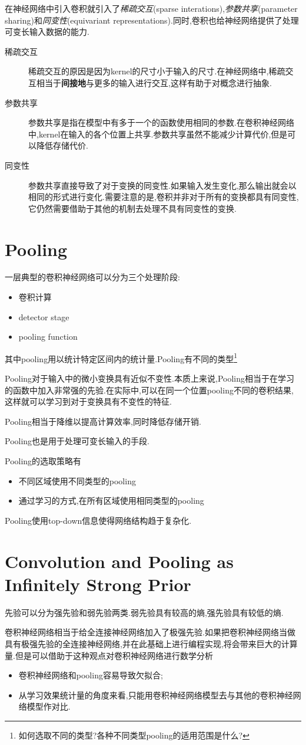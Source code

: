 在神经网络中引入卷积就引入了\textit{稀疏交互}(sparse interations),\textit{参数共享}(parameter sharing)和\textit{同变性}(equivariant representations).同时,卷积也给神经网络提供了处理可变长输入数据的能力.
\begin{description}
    \item [稀疏交互]
    稀疏交互的原因是因为kernel的尺寸小于输入的尺寸.在神经网络中,稀疏交互相当于\textbf{间接地}与更多的输入进行交互,这样有助于对概念进行抽象.
    \item [参数共享]
    参数共享是指在模型中有多于一个的函数使用相同的参数.在卷积神经网络中,kernel在输入的各个位置上共享.参数共享虽然不能减少计算代价,但是可以降低存储代价.
    \item [同变性]
    参数共享直接导致了对于变换的同变性.如果输入发生变化,那么输出就会以相同的形式进行变化.需要注意的是,卷积并非对于所有的变换都具有同变性,它仍然需要借助于其他的机制去处理不具有同变性的变换.
\end{description}

\section{Pooling}

一层典型的卷积神经网络可以分为三个处理阶段:
\begin{itemize}
    \item 卷积计算
    \item detector stage
    \item pooling function
\end{itemize}
其中pooling用以统计特定区间内的统计量.Pooling有不同的类型\footnote{如何选取不同的类型?各种不同类型pooling的适用范围是什么?}

Pooling对于输入中的微小变换具有近似不变性.本质上来说,Pooling相当于在学习的函数中加入非常强的先验.在实际中,可以在同一个位置pooling不同的卷积结果,这样就可以学习到对于变换具有不变性的特征.

Pooling相当于降维以提高计算效率,同时降低存储开销.

Pooling也是用于处理可变长输入的手段.

Pooling的选取策略有
\begin{itemize}
    \item 不同区域使用不同类型的pooling
    \item 通过学习的方式,在所有区域使用相同类型的pooling
\end{itemize}

Pooling使用top-down信息使得网络结构趋于复杂化.

\section{Convolution and Pooling as Infinitely Strong Prior}

先验可以分为强先验和弱先验两类.弱先验具有较高的熵,强先验具有较低的熵.

卷积神经网络相当于给全连接神经网络加入了极强先验.如果把卷积神经网络当做具有极强先验的全连接神经网络,并在此基础上进行编程实现,将会带来巨大的计算量.但是可以借助于这种观点对卷积神经网络进行数学分析
\begin{itemize}
    \item 卷积神经网络和pooling容易导致欠拟合;
    \item 从学习效果统计量的角度来看,只能用卷积神经网络模型去与其他的卷积神经网络模型作对比.
\end{itemize}